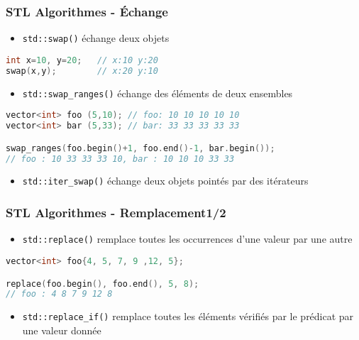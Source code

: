 \documentclass[C++.tex]{subfiles}
\begin{document}
\begin{frame}[fragile]
	\frametitle{STL Algorithmes - Échange}
	\begin{itemize}
		\item \lstinline|std::swap()| échange deux objets
	\end{itemize}

	\begin{lstlisting}[language=C++]
int x=10, y=20;   // x:10 y:20
swap(x,y);        // x:20 y:10\end{lstlisting}

	\begin{itemize}
		\item \lstinline|std::swap_ranges()| échange des éléments de deux ensembles
	\end{itemize}

	\begin{lstlisting}[language=C++]
vector<int> foo (5,10); // foo: 10 10 10 10 10
vector<int> bar (5,33); // bar: 33 33 33 33 33

swap_ranges(foo.begin()+1, foo.end()-1, bar.begin());
// foo : 10 33 33 33 10, bar : 10 10 10 33 33\end{lstlisting}

	\begin{itemize}
		\item \lstinline|std::iter_swap()| échange deux objets pointés par des itérateurs
	\end{itemize}
\end{frame}

\begin{frame}[fragile]
	\frametitle{STL Algorithmes - Remplacement\titlehfill{}1/2}
	\begin{itemize}
		\item \lstinline|std::replace()| remplace toutes les occurrences d'une valeur par une autre
	\end{itemize}

	\begin{lstlisting}[language=C++]
vector<int> foo{4, 5, 7, 9 ,12, 5};

replace(foo.begin(), foo.end(), 5, 8); 
// foo : 4 8 7 9 12 8\end{lstlisting}

	\begin{itemize}
		\item \lstinline|std::replace_if()| remplace toutes les éléments vérifiés par le prédicat par une valeur donnée
	\end{itemize}
\end{frame}
\end{document}

